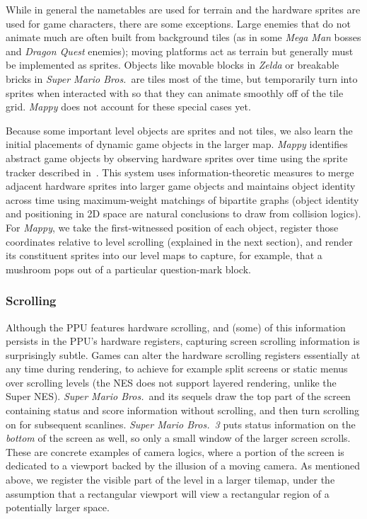 \documentclass[12pt]{report}
\begin{document}
While in general the nametables are used for terrain and the hardware sprites are used for game characters, there are some exceptions.
Large enemies that do not animate much are often built from background tiles (as in some \emph{Mega Man} bosses and \emph{Dragon Quest} enemies); moving platforms act as terrain but generally must be implemented as sprites.
Objects like movable blocks in \emph{Zelda} or breakable bricks in \emph{Super Mario Bros.}\ are tiles most of the time, but temporarily turn into sprites when interacted with so that they can animate smoothly off of the tile grid.
\emph{Mappy} does not account for these special cases yet.

Because some important level objects are sprites and not tiles, we also learn the initial placements of dynamic game objects in the larger map.
\emph{Mappy} identifies abstract game objects by observing hardware sprites over time using the sprite tracker described in~\cite{summerville2017mechanics}.
This system uses information-theoretic measures to merge adjacent hardware sprites into larger game objects and maintains object identity across time using maximum-weight matchings of bipartite graphs (object identity and positioning in 2D space are natural conclusions to draw from collision logics).
For \emph{Mappy}, we take the first-witnessed position of each object, register those coordinates relative to level scrolling (explained in the next section), and render its constituent sprites into our level maps to capture, for example, that a mushroom pops out of a particular question-mark block.

\subsubsection*{Scrolling}

Although the PPU features hardware scrolling, and (some) of this information persists in the PPU's hardware registers, capturing screen scrolling information is surprisingly subtle.
Games can alter the hardware scrolling registers essentially at any time during rendering, to achieve for example split screens or static menus over scrolling levels (the NES does not support layered rendering, unlike the Super NES).
\emph{Super Mario Bros.}\ and its sequels draw the top part of the screen containing status and score information without scrolling, and then turn scrolling on for subsequent scanlines.
\emph{Super Mario Bros.\ 3} puts status information on the \emph{bottom} of the screen as well, so only a small window of the larger screen scrolls.
These are concrete examples of camera logics, where a portion of the screen is dedicated to a viewport backed by the illusion of a moving camera.
As mentioned above, we register the visible part of the level in a larger tilemap, under the assumption that a rectangular viewport will view a rectangular region of a potentially larger space.
\end{document}
